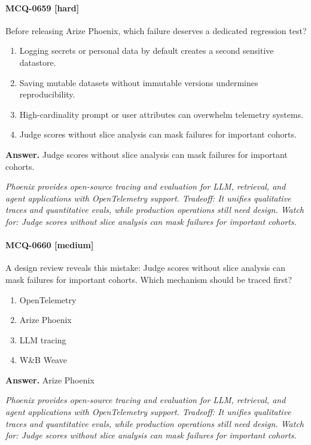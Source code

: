 \paragraph{MCQ-0659 [hard]} Before releasing Arize Phoenix, which failure deserves a dedicated regression test?
\begin{enumerate}[label=\Alph*.]
\item Logging secrets or personal data by default creates a second sensitive datastore.
\item Saving mutable datasets without immutable versions undermines reproducibility.
\item High-cardinality prompt or user attributes can overwhelm telemetry systems.
\item Judge scores without slice analysis can mask failures for important cohorts.
\end{enumerate}
\noindent\textbf{Answer.} Judge scores without slice analysis can mask failures for important cohorts.
\par\textit{Phoenix provides open-source tracing and evaluation for LLM, retrieval, and agent applications with OpenTelemetry support. Tradeoff: It unifies qualitative traces and quantitative evals, while production operations still need design. Watch for: Judge scores without slice analysis can mask failures for important cohorts.}
\paragraph{MCQ-0660 [medium]} A design review reveals this mistake: Judge scores without slice analysis can mask failures for important cohorts. Which mechanism should be traced first?
\begin{enumerate}[label=\Alph*.]
\item OpenTelemetry
\item Arize Phoenix
\item LLM tracing
\item W\&B Weave
\end{enumerate}
\noindent\textbf{Answer.} Arize Phoenix
\par\textit{Phoenix provides open-source tracing and evaluation for LLM, retrieval, and agent applications with OpenTelemetry support. Tradeoff: It unifies qualitative traces and quantitative evals, while production operations still need design. Watch for: Judge scores without slice analysis can mask failures for important cohorts.}
